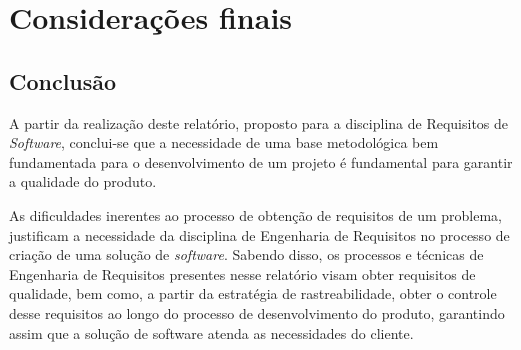 \chapter[Considerações finais]{Considerações finais}

  \section*{Conclusão}
    
    A partir da realização deste relatório, proposto para a disciplina de Requisitos de \textit{Software}, 
    conclui-se que a necessidade de uma base metodológica bem fundamentada para o desenvolvimento de um projeto é 
    fundamental para garantir a qualidade do produto. 
    
    As dificuldades inerentes ao processo de obtenção de requisitos de um problema, 
    justificam a necessidade da disciplina de Engenharia de Requisitos no processo de criação de uma solução de \textit{software}. 
    Sabendo disso, os processos e técnicas de Engenharia de Requisitos presentes nesse relatório visam obter requisitos de qualidade, 
    bem como, a partir da estratégia de rastreabilidade, 
    obter o controle desse requisitos ao longo do processo de desenvolvimento do produto, 
    garantindo assim que a solução de software atenda as necessidades do cliente.